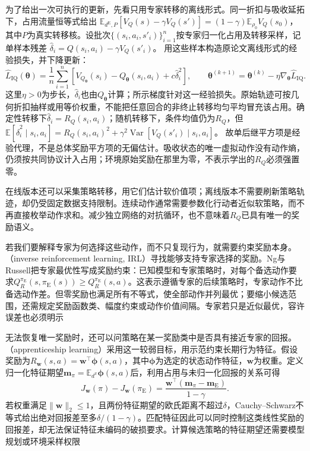 为了给出一次可执行的更新，先看只用专家转移的离线形式。同一折扣与吸收延拓下，占用流量恒等式给出
$\mathbb E_{d^{\mathrm E},P}[V_Q(s)-\gamma V_Q(s')]
=(1-\gamma)\mathbb E_{\rho_0}V_Q(s_0)$，
其中$P$为真实转移核。设批次$\{(s_i,a_i,s'_i)\}_{i=1}^n$按专家归一化占用及转移采样，记单样本残差
$\widehat\delta_i=Q(s_i,a_i)-\gamma V_Q(s'_i)$。
用这些样本构造原论文离线形式的经验损失，并下降更新：
\[
  \widehat L_{\mathrm{IQ}}(\bm\theta)
  =\frac1n\sum_{i=1}^n
      \left[V_{Q_{\bm\theta}}(s_i)-Q_{\bm\theta}(s_i,a_i)
                    +c\widehat\delta_i^2\right],
  \qquad
  \bm\theta^{(k+1)}
  =\bm\theta^{(k)}-\eta\nabla_{\bm\theta}\widehat L_{\mathrm{IQ}}.
\]
这里$\eta>0$为步长，$\widehat\delta_i$也由$Q_{\bm\theta}$计算；所示梯度针对这一经验损失。原始轨迹可按几何折扣抽样或用等价权重，不能把任意回合的非终止转移均匀平均冒充该占用。确定性转移下$\widehat\delta_i=R_Q(s_i,a_i)$；随机转移下，条件均值仍为$R_Q$，但
$\mathbb E[\widehat\delta_i^2\mid s_i,a_i]
=R_Q(s_i,a_i)^2+\gamma^2\operatorname{Var}[V_Q(s'_i)\mid s_i,a_i]$。
故单后继平方项是经验代理，不是总体奖励平方项的无偏估计。吸收状态的唯一虚拟动作没有动作熵，仍须按共同协议计入占用；环境原始奖励在那里为零，不表示学出的$R_Q$必须强置零。

在线版本还可以采集策略转移，用它们估计软价值项；离线版本不需要刷新策略轨迹，却仍受固定数据支持限制。连续动作通常需要参数化行动者近似软策略，而不再直接枚举动作求和。减少独立网络的对抗循环，也不意味着$R_Q$已具有唯一的奖励语义。

若我们要解释专家为何选择这些动作，而不只复现行为，就需要约束奖励本身。（inverse reinforcement learning, IRL）寻找能够支持专家选择的奖励。Ng与Russell把专家最优性写成奖励约束：已知模型和专家策略时，对每个备选动作要求$Q_R^{\pi_{\mathrm E}}(s,\pi_{\mathrm E}(s))\geq Q_R^{\pi_{\mathrm E}}(s,a)$。这表示遵循专家的后续策略时，专家动作不比备选动作差。但零奖励也满足所有不等式，使全部动作并列最优；要缩小候选范围，还需规定奖励函数类、幅度约束或动作价值间隔。专家若只是近似最优，容许误差也必须明示

无法恢复唯一奖励时，还可以问策略在某一奖励类中是否具有接近专家的回报。（apprenticeship learning）采用这一较弱目标，用示范约束长期行为特征。假设奖励为$R_{\bm w}(s,a)=\bm w^\top\bm\phi(s,a)$，其中$\bm\phi$为选定的状态动作特征，$\bm w$为权重。定义归一化特征期望$\bm m_\pi=\mathbb E_{d^\pi}\bm\phi(s,a)$后，利用占用与未归一化回报的关系可得
\begin{equation}
  J_{\bm w}(\pi)-J_{\bm w}(\pi_{\mathrm E})
  =\frac{\bm w^\top(\bm m_\pi-\bm m_{\mathrm E})}{1-\gamma}.
  \label{eq:rl-reward-feature}
\end{equation}
若权重满足$\lVert\bm w\rVert_2\leq1$，且两份特征期望的欧氏距离不超过$\delta$，Cauchy--Schwarz不等式给出绝对回报差至多$\delta/(1-\gamma)$。匹配特征因此可以同时控制这类线性奖励的回报差，却无法保证特征未编码的破损要求。计算候选策略的特征期望还需要模型规划或环境采样权限


